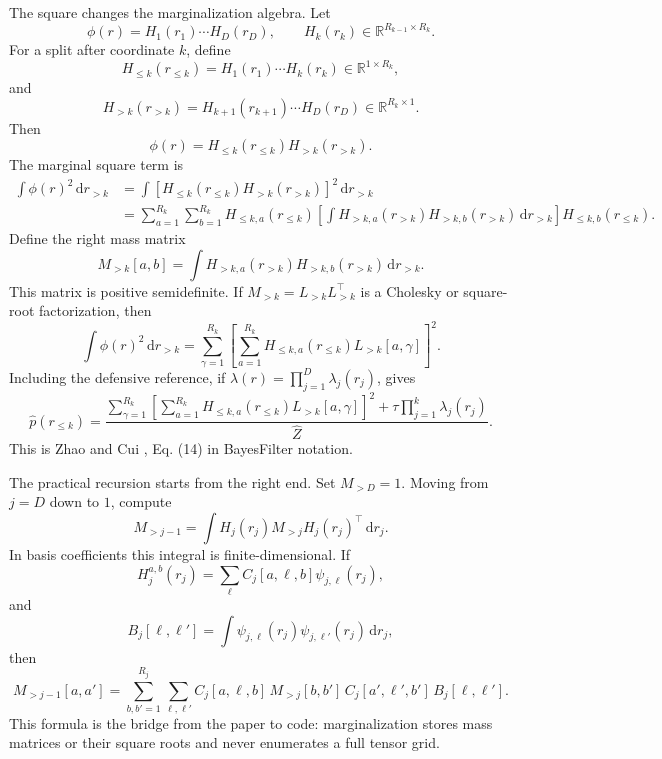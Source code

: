 \documentclass[11pt]{article}
\numberwithin{equation}{section}
\newcommand{\R}{\mathbb R}
\newcommand{\dd}{\,\mathrm d}
\begin{document}
The square changes the marginalization algebra.  Let
\[
    \phi(r)=H_1(r_1)\cdots H_D(r_D),
    \qquad H_k(r_k)\in\R^{R_{k-1}\times R_k}.
\]
For a split after coordinate \(k\), define
\[
    H_{\le k}(r_{\le k})=H_1(r_1)\cdots H_k(r_k)\in\R^{1\times R_k},
\]
and
\[
    H_{>k}(r_{>k})=H_{k+1}(r_{k+1})\cdots H_D(r_D)\in\R^{R_k\times 1}.
\]
Then
\[
    \phi(r)=H_{\le k}(r_{\le k})H_{>k}(r_{>k}).
\]
The marginal square term is
\begin{equation}
\begin{aligned}
 \int \phi(r)^2\dd r_{>k}
 &=
 \int
 \left[
 H_{\le k}(r_{\le k})H_{>k}(r_{>k})
 \right]^2\dd r_{>k}\\
 &=
 \sum_{a=1}^{R_k}\sum_{b=1}^{R_k}
 H_{\le k,a}(r_{\le k})
 \left[
 \int H_{>k,a}(r_{>k})H_{>k,b}(r_{>k})\dd r_{>k}
 \right]
 H_{\le k,b}(r_{\le k}).
\end{aligned}
\label{eq:p24-m1}
\end{equation}
Define the right mass matrix
\begin{equation}
    M_{>k}[a,b]
    =
    \int H_{>k,a}(r_{>k})H_{>k,b}(r_{>k})\dd r_{>k}.
    \label{eq:p24-m2}
\end{equation}
This matrix is positive semidefinite.  If \(M_{>k}=L_{>k}L_{>k}^\top\) is a
Cholesky or square-root factorization, then
\begin{equation}
    \int \phi(r)^2\dd r_{>k}
    =
    \sum_{\gamma=1}^{R_k}
    \left[
    \sum_{a=1}^{R_k}H_{\le k,a}(r_{\le k})L_{>k}[a,\gamma]
    \right]^2.
    \label{eq:p24-m3}
\end{equation}
Including the defensive reference, if
\(\lambda(r)=\prod_{j=1}^D\lambda_j(r_j)\), gives
\begin{equation}
    \widehat p(r_{\le k})
    =
    \frac{
    \sum_{\gamma=1}^{R_k}
    \left[
    \sum_{a=1}^{R_k}H_{\le k,a}(r_{\le k})L_{>k}[a,\gamma]
    \right]^2
    +
    \tau\prod_{j=1}^k\lambda_j(r_j)}
    {\widehat Z}.
    \label{eq:p24-m4}
\end{equation}
This is Zhao and Cui \cite{zhao2024ttsequential}, Eq. (14) in BayesFilter notation.

The practical recursion starts from the right end.  Set \(M_{>D}=1\).  Moving
from \(j=D\) down to \(1\), compute
\begin{equation}
    M_{>j-1}
    =
    \int H_j(r_j)M_{>j}H_j(r_j)^\top\dd r_j.
    \label{eq:p24-m5}
\end{equation}
In basis coefficients this integral is finite-dimensional.  If
\[
    H_j^{a,b}(r_j)=\sum_{\ell}C_j[a,\ell,b]\psi_{j,\ell}(r_j),
\]
and
\[
    B_j[\ell,\ell']
    =
    \int \psi_{j,\ell}(r_j)\psi_{j,\ell'}(r_j)\dd r_j,
\]
then
\begin{equation}
    M_{>j-1}[a,a']
    =
    \sum_{b,b'=1}^{R_j}
    \sum_{\ell,\ell'}
    C_j[a,\ell,b]\,M_{>j}[b,b']\,C_j[a',\ell',b']\,B_j[\ell,\ell'].
    \label{eq:p24-m6}
\end{equation}
This formula is the bridge from the paper to code: marginalization stores mass
matrices or their square roots and never enumerates a full tensor grid.
\end{document}
